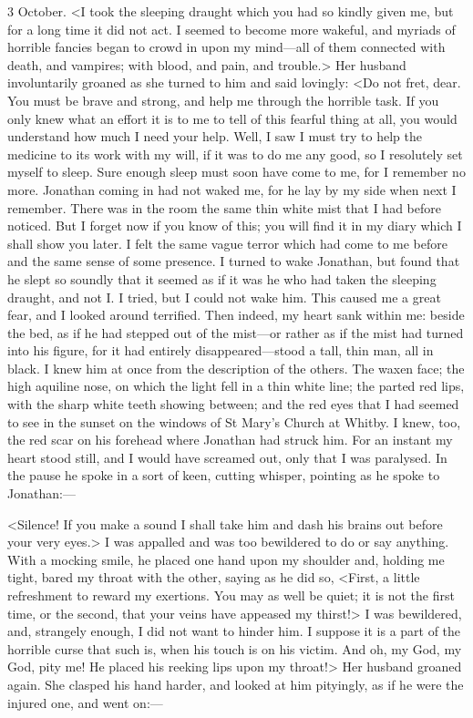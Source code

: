 \begin{diary}{3 October.}
<I took the sleeping draught which you had so kindly given me, but for a long time it did not act. I seemed to become more wakeful, and myriads of horrible fancies began to crowd in upon my mind—all of them connected with death, and vampires; with blood, and pain, and trouble.> Her husband involuntarily groaned as she turned to him and said lovingly: <Do not fret, dear. You must be brave and strong, and help me through the horrible task. If you only knew what an effort it is to me to tell of this fearful thing at all, you would understand how much I need your help. Well, I saw I must try to help the medicine to its work with my will, if it was to do me any good, so I resolutely set myself to sleep. Sure enough sleep must soon have come to me, for I remember no more. Jonathan coming in had not waked me, for he lay by my side when next I remember. There was in the room the same thin white mist that I had before noticed. But I forget now if you know of this; you will find it in my diary which I shall show you later. I felt the same vague terror which had come to me before and the same sense of some presence. I turned to wake Jonathan, but found that he slept so soundly that it seemed as if it was he who had taken the sleeping draught, and not I\@. I tried, but I could not wake him. This caused me a great fear, and I looked around terrified. Then indeed, my heart sank within me: beside the bed, as if he had stepped out of the mist—or rather as if the mist had turned into his figure, for it had entirely disappeared—stood a tall, thin man, all in black. I knew him at once from the description of the others. The waxen face; the high aquiline nose, on which the light fell in a thin white line; the parted red lips, with the sharp white teeth showing between; and the red eyes that I had seemed to see in the sunset on the windows of St Mary's Church at Whitby. I knew, too, the red scar on his forehead where Jonathan had struck him. For an instant my heart stood still, and I would have screamed out, only that I was paralysed. In the pause he spoke in a sort of keen, cutting whisper, pointing as he spoke to Jonathan:—

<Silence! If you make a sound I shall take him and dash his brains out before your very eyes.> I was appalled and was too bewildered to do or say anything. With a mocking smile, he placed one hand upon my shoulder and, holding me tight, bared my throat with the other, saying as he did so, <First, a little refreshment to reward my exertions. You may as well be quiet; it is not the first time, or the second, that your veins have appeased my thirst!> I was bewildered, and, strangely enough, I did not want to hinder him. I suppose it is a part of the horrible curse that such is, when his touch is on his victim. And oh, my God, my God, pity me! He placed his reeking lips upon my throat!> Her husband groaned again. She clasped his hand harder, and looked at him pityingly, as if he were the injured one, and went on:—


\end{diary}
